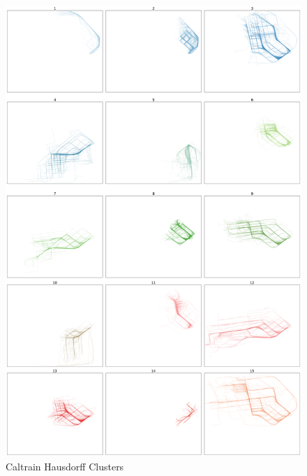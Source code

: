 \documentclass[a4paper, 12pt]{article}
\begin{document}
\begin{figure}[htbp!]
    \centering
    \includegraphics[width=1\textwidth]{Caltrain Hausdorff.png}
    \caption{Caltrain Hausdorff Clusters}
    \label{fig42}
\end{figure}
\end{document}

